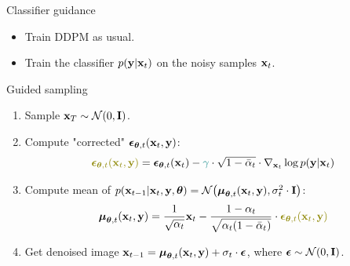 \begin{frame}{Classifier guidance}
	\begin{itemize}
		\item Train DDPM as usual.
		\item Train the classifier $p(\mathbf{y} | \mathbf{x}_t)$ on the noisy samples $\mathbf{x}_t$.
	\end{itemize}
	\begin{block}{Guided sampling}
		\begin{enumerate}
			\item Sample $\mathbf{x}_T \sim \mathcal{N}(0, \mathbf{I})$.
			\item Compute "corrected" $\boldsymbol{\epsilon}_{\boldsymbol{\theta}, t}(\mathbf{x}_t, \mathbf{y})$:
			\[
				{\color{olive}\bepsilon_{\btheta, t}(\bx_t, \by)} = \bepsilon_{\btheta, t}(\bx_t) - {\color{teal}\gamma} \cdot \sqrt{1 - \bar{\alpha}_t} \cdot \nabla_{\bx_t} \log p(\by | \bx_t)
			\]
			\item Compute mean of $p(\mathbf{x}_{t-1} | \mathbf{x}_t, \mathbf{y}, \boldsymbol{\theta}) = \mathcal{N}\bigl(\boldsymbol{\mu}_{\boldsymbol{\theta}, t}(\mathbf{x}_t, \mathbf{y}), \sigma_t^2 \cdot \mathbf{I}\bigr)$:
			\[
				\bmu_{\btheta, t}(\bx_t, \by) = \frac{1}{\sqrt{\alpha_t}} \bx_t - \frac{1 - \alpha_t}{\sqrt{\alpha_t (1 - \bar{\alpha}_t)}} \cdot  	{\color{olive}\bepsilon_{\btheta, t}(\bx_t, \by)}
			\]
			\vspace{-0.3cm}
			\item Get denoised image $\mathbf{x}_{t - 1} = \boldsymbol{\mu}_{\boldsymbol{\theta}, t}(\mathbf{x}_t, \mathbf{y}) + \sigma_t \cdot \boldsymbol{\epsilon}$, where $\boldsymbol{\epsilon} \sim \mathcal{N}(0, \mathbf{I})$.
		\end{enumerate}
	\end{block}
\end{frame}
